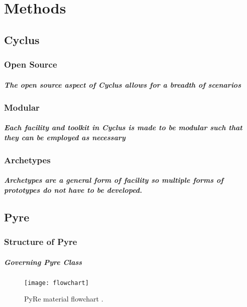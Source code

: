 \chapter[Methods]{Methods}
\section{Cyclus}
\subsection{Open Source}

\paragraph{The open source aspect of Cyclus allows for a breadth of scenarios}

\subsection{Modular}

\paragraph{Each facility and toolkit in Cyclus is made to be modular such that they can be employed as necessary}

\subsection{Archetypes}

\paragraph{Archetypes are a general form of facility so multiple forms of prototypes do not have to be developed.}

\section{Pyre}

\subsection{Structure of Pyre}
\paragraph{Governing Pyre Class}

\begin{figure}
	\centering
	\texttt{[image: flowchart]}
	\caption{PyRe material flowchart \cite{borrelli_approaches_2017}.}
	\label{fig:flowchart}
\end{figure}

